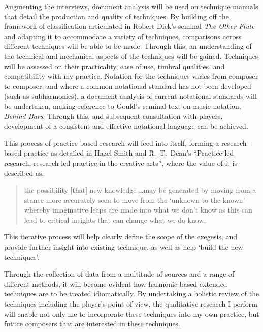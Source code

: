 Augmenting the interviews, document analysis will be used on technique manuals that detail the production and quality of techniques. 
By building off the framework of classification articulated in Robert Dick’s seminal \emph{The Other Flute} and adapting it to accommodate a variety of techniques, comparisons across different techniques will be able to be made.\autocite{dickOtherFlute1989} 
Through this, an understanding of the technical and mechanical aspects of the techniques will be gained. 
Techniques will be assessed on their practicality, ease of use, timbral qualities, and compatibility with my practice. 
Notation for the techniques varies from composer to composer, and where a common notational standard has not been developed (such as subharmonics), a document analysis of current notational standards will be undertaken, making reference to Gould’s seminal text on music notation, \emph{Behind Bars}.\autocite{gouldBars2011} 
Through this, and subsequent consultation with players, development of a consistent and effective notational language can be achieved.

This process of practice-based research will feed into itself, forming a research-based practice as detailed in Hazel Smith and R.\ T.\ Dean's ``Practice-led research, research-led practice in the creative arts'', where the value of it is described as: \begin{quotation}
    the possibility [that] new knowledge \ldots may be generated by moving from a stance more accurately seen to move from the `unknown to the known' whereby imaginative leaps are made into what we don't know as this can lead to critical insights that can change what we do know.\autocite[48]{smithPracticeledResearchResearchled2009}
\end{quotation}
This iterative process will help clearly define the scope of the exegesis, and provide further insight into existing technique, as well as help `build the new techniques'.

Through the collection of data from a multitude of sources and a range of different methods, it will become evident how harmonic based extended techniques are to be treated idiomatically. 
By undertaking a holistic review of the techniques including the player's point of view, the qualitative research I perform will enable not only me to incorporate these techniques into my own practice, but future composers that are interested in these techniques.


